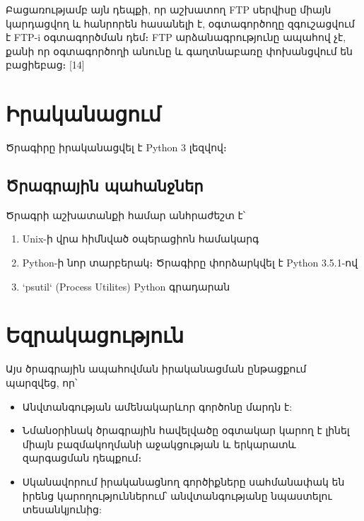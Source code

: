 \documentclass[10pt]{article}
\begin{document}
\begin{sloppypar}
Բացառությամբ այն դեպքի, որ աշխատող FTP սերվիսը միայն կարդացվող և
հանրորեն հասանելի է, օգտագործողը զգուշացվում է FTP-i օգտագործման դեմ։
FTP արձանագրությունը ապահով չէ, քանի որ օգտագործողի անունը և
գաղտնաբառը փոխանցվում են բացիեբաց։ [14]


\section{Իրականացում}


Ծրագիրը իրականացվել է Python 3 լեզվով։

\subsection{Ծրագրային պահանջներ}

Ծրագրի աշխատանքի համար անհրաժեշտ է՝

\begin{enumerate}
\item Unix-ի վրա հիմնված օպերացիոն համակարգ
\item Python-ի նոր տարբերակ։ Ծրագիրը փորձարկվել է Python 3.5.1-ով
\item `psutil` (Process Utilites) Python գրադարան
\end{enumerate}


\newpage
\section{Եզրակացություն}

Այս ծրագրային ապահովման իրականացման ընթացքում պարզվեց, որ՝

\begin{itemize}
\item Անվտանգության ամենակարևոր գործոնը մարդն է:
\item Նմանօրինակ ծրագրային հավելվածը օգտակար կարող է
    լինել միայն բազմակողմանի աջակցության և երկարատև զարգացման
    դեպքում։
\item Սկանավորում իրականացնող գործիքները սահմանափակ են
    իրենց կարողություններում՝ անվտանգությանը նպաստելու
    տեսանկյունից:
\end{itemize}


\newpage

\end{sloppypar}
\end{document}
